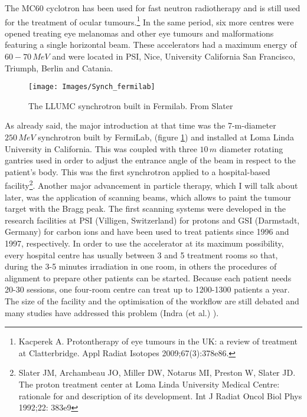 \documentclass[12pt, a4paper, twoside]{book}
\begin{document}
The MC60 cyclotron has been used for fast neutron radiotherapy and is still used for the treatment of ocular tumours.\footnote{Kacperek A. Protontherapy of eye tumours in the UK: a review of treatment at
Clatterbridge. Appl Radiat Isotopes 2009;67(3):378e86.} In the same period, six more centres were opened treating eye melanomas and other eye tumours and malformations featuring a single horizontal beam. These accelerators had a maximum energy of $60-70\,MeV$ and were located in PSI, Nice, University California San Francisco, Triumph, Berlin and Catania.
\begin{figure}[!t]
\centering
{\texttt{[image: Images/Synch\_fermilab]}}
\caption{The LLUMC synchrotron built in Fermilab. From Slater \cite{jd:llu}}
\label{fig:synchF}
\end{figure}
As already said, the major introduction at that time was the 7-m-diameter $250\,MeV$ synchrotron built by FermiLab, (figure \ref{fig:synchF}) and installed at Loma Linda University in California. This was coupled with three $10\,m$ diameter rotating gantries used in order to adjust the entrance angle of the beam in respect to the patient's body.
This was the first synchrotron applied to a hospital-based facility\footnote{Slater JM, Archambeau JO, Miller DW, Notarus MI, Preston W, Slater JD. The proton treatment center at Loma Linda University Medical Centre: rationale
for and description of its development. Int J Radiat Oncol Biol Phys 1992;22: 383e9}.
Another major advancement in particle therapy, which I will talk about later, was the application of scanning beams, which allows to paint the tumour target with the Bragg peak.
The first scanning systems were developed in the research facilities at PSI (Villigen, Switzerland) for protons and GSI (Darmstadt, Germany) for carbon ions and have been used to treat patients since 1996 and 1997, respectively.
In order to use the accelerator at its maximum possibility, every hospital centre has usually between 3 and 5 treatment rooms so that, during the 3-5 minutes irradiation in one room, in others the procedures of alignment to prepare other patients can be started. Because each patient needs 20-30 sessions, one four-room centre can treat up to 1200-1300 patients a year. The size of the facility and the optimisation of the workflow are still debated and many studies have addressed this problem (Indra (et al.) \cite{Indra:fac}).
\end{document}
